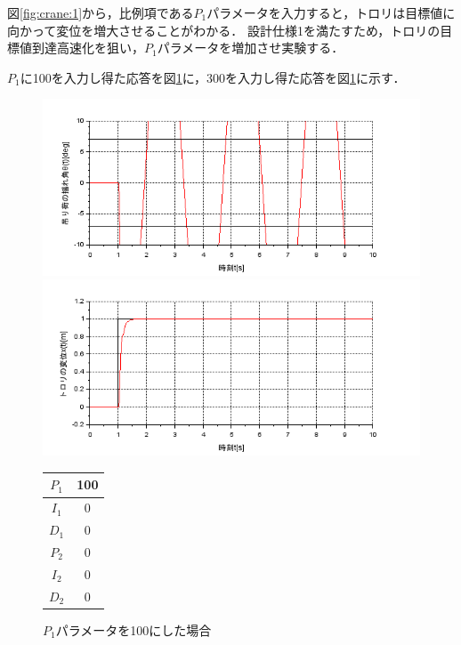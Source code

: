 \documentclass[dvipdfmx,titlepage,a4j]{jsarticle}  %
\begin{document}
図\ref{fig:crane:1}から，比例項である$P_1$パラメータを入力すると，トロリは目標値に向かって変位を増大させることがわかる．
設計仕様1を満たすため，トロリの目標値到達高速化を狙い，$P_1$パラメータを増加させ実験する．

$P_1$に100を入力し得た応答を図\ref{fig:crane:2}に，300を入力し得た応答を図\ref{fig:crane:2}に示す．

\begin{figure}[H]
  \begin{minipage}{4.5cm}
    \centering
    \includegraphics[keepaspectratio, scale=0.35]{../graph/crane/ang-P1-100-I1-0-D1-0-P2-0-I2-0-D2-0.png}
  \end{minipage}
  \hfill
  \begin{minipage}{4.5cm}
    \centering
    \includegraphics[keepaspectratio, scale=0.35]{../graph/crane/po-P1-100-I1-0-D1-0-P2-0-I2-0-D2-0.png}
  \end{minipage}
  \hfill
  \begin{minipage}{3cm}
    \begin{center}
      \begin{tabular}{c|c}
        \hline
        $P_1$ & 100\\ \hline
        $I_1$ & 0\\ \hline
        $D_1$ & 0\\ \hline
        $P_2$ & 0\\ \hline
        $I_2$ & 0\\ \hline
        $D_2$ & 0\\
        \hline
      \end{tabular}
    \end{center}
  \end{minipage}
  \hfill
  \caption{$P_1$パラメータを100にした場合}
  \label{fig:crane:2}
\end{figure}
\end{document}
